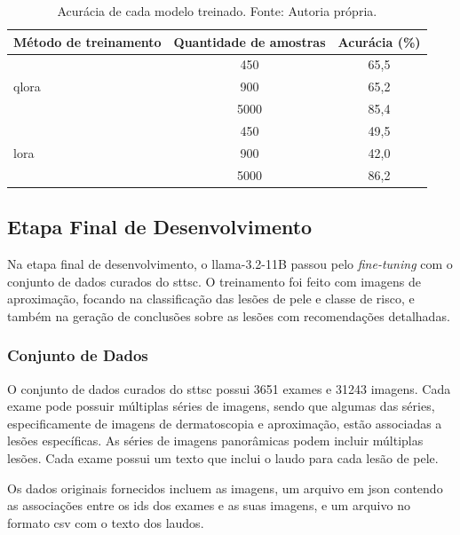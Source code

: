 \begin{table}[ht]
    \centering
    \begin{tabular}{l|c|c}
        \hline
        Método de treinamento       & Quantidade de amostras & Acurácia (\%) \\ \hline
        \multirow{3}{*}{\ac{qlora}} & 450                    & 65,5          \\
                                    & 900                    & 65,2          \\
                                    & 5000                   & 85,4          \\ \hline
        \multirow{3}{*}{\ac{lora}}  & 450                    & 49,5          \\
                                    & 900                    & 42,0          \\
                                    & 5000                   & 86,2          \\ \hline
    \end{tabular}
    \label{tab:training_accuracies}
    \caption{Acurácia de cada modelo treinado. Fonte: Autoria própria.}
\end{table}

\subsection{Etapa Final de Desenvolvimento}

Na etapa final de desenvolvimento, o \ac{llama}-3.2-11B passou pelo \textit{fine-tuning} com o conjunto de dados
curados do \ac{sttsc}. O treinamento foi feito com imagens de aproximação, focando na classificação das lesões de pele
e classe de risco, e também na geração de conclusões sobre as lesões com recomendações detalhadas.

\subsubsection{Conjunto de Dados}

O conjunto de dados curados do \ac{sttsc} possui 3651 exames e 31243 imagens. Cada exame pode possuir múltiplas séries
de imagens, sendo que algumas das séries, especificamente de imagens de dermatoscopia e aproximação, estão associadas a
lesões específicas. As séries de imagens panorâmicas podem incluir múltiplas lesões. Cada exame possui um texto que
inclui o laudo para cada lesão de pele.

Os dados originais fornecidos incluem as imagens, um arquivo em \ac{json} contendo as associações entre os \acp{id} dos
exames e as suas imagens, e um arquivo no formato \ac{csv} com o texto dos laudos.

